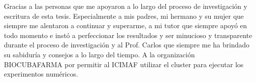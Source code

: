\begin{acknowledgements}

  Gracias a las personas que me apoyaron a lo largo del proceso de investigación y escritura de esta tesis. Especialmente a mis padres, mi hermano y su mujer que
  siempre me alentaron a continuar y superarme, a mi tutor que siempre apoyó en todo momento e instó a perfeccionar los resultados y ser minucioso y transparente
  durante el proceso de investigación y al Prof. Carlos que siempre me ha brindado su sabiduría y consejos a lo largo del tiempo. A la organización BIOCUBAFARMA por permitir al ICIMAF utilizar el cluster para ejecutar los experimentos numéricos.

\end{acknowledgements}